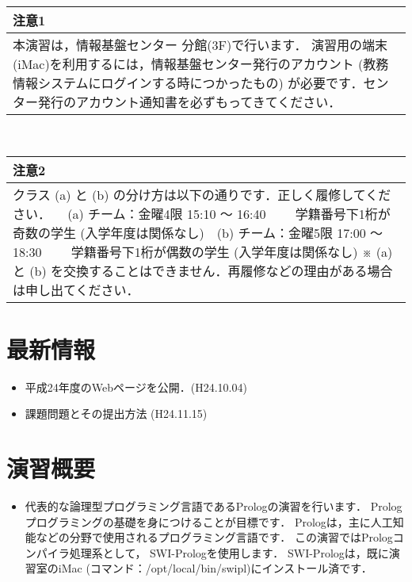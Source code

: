 \documentclass[a4j]{article}
\begin{document}
\begin{center}
\begin{tabular}{l}
\hline
 \textbf{注意1}                                                                                                                                                                                                                            \\
\hline
 本演習は，情報基盤センター 分館(3F)で行います． 演習用の端末(iMac)を利用するには，情報基盤センター発行のアカウント (教務情報システムにログインする時につかったもの) が必要です．センター発行のアカウント通知書を必ずもってきてください．  \\
\hline
\end{tabular}
\end{center}


　

\begin{center}
\begin{tabular}{l}
\hline
 \textbf{注意2}                                                                                                                                                                                                                                                                                                                                              \\
\hline
 クラス (a) と (b) の分け方は以下の通りです．正しく履修してください． 　(a) チーム：金曜4限 15:10 〜 16:40 　　学籍番号下1桁が奇数の学生 (入学年度は関係なし)　(b) チーム：金曜5限 17:00 〜 18:30 　　学籍番号下1桁が偶数の学生 (入学年度は関係なし) ※ (a) と (b) を交換することはできません．再履修などの理由がある場合は申し出てください．　　　　　　　  \\
\hline
\end{tabular}
\end{center}
\section*{最新情報}
\label{sec-3}
\begin{itemize}

\item 平成24年度のWebページを公開．(H24.10.04)
\label{sec-3-1}%

\item 課題問題とその提出方法 (H24.11.15)
\label{sec-3-2}%

\end{itemize} %
\section*{演習概要}
\label{sec-4}
\begin{itemize}

\item 代表的な論理型プログラミング言語であるPrologの演習を行います． Prologプログラミングの基礎を身につけることが目標です． Prologは，主に人工知能などの分野で使用されるプログラミング言語です． この演習ではPrologコンパイラ処理系として， SWI-Prologを使用します． SWI-Prologは，既に演習室のiMac (コマンド：/opt/local/bin/swipl)にインストール済です．
\label{sec-4-1}%

\end{itemize} %
\end{document}
